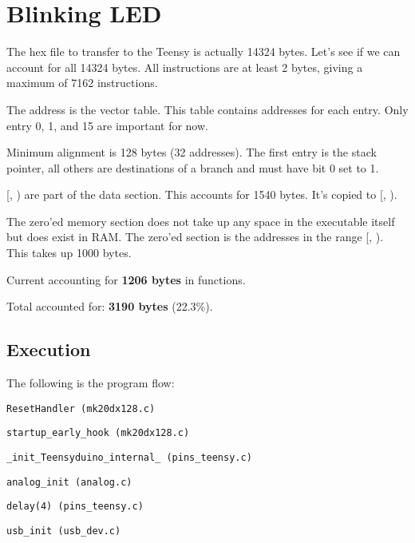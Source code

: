 \newpage
\section{Blinking LED}

The hex file to transfer to the Teensy is actually 14324 bytes.
Let's see if we can account for all 14324 bytes.
All instructions are at least 2 bytes, giving a maximum of 7162 instructions.

The address  is the vector table. This table contains
addresses for each entry. Only entry 0, 1, and 15 are important for now.

Minimum alignment is 128 bytes (32 addresses). The first entry is the stack
pointer, all others are destinations of a branch and must have bit 0 set to 1.

[, ) are part of the data
section. This accounts for 1540 bytes. It's copied to
[, ).

The zero'ed memory section does not take up any space in the executable itself
but does exist in RAM. The zero'ed section is the addresses in the range
[, ).
This takes up 1000 bytes.

Current accounting for \textbf{1206 bytes} in functions.

Total accounted for: \textbf{3190 bytes} (22.3\%).

\subsection{Execution}

The following is the program flow:

\indent \texttt{ResetHandler (mk20dx128.c)}

\hspace{2mm} \texttt{startup\_early\_hook (mk20dx128.c)}

\hspace{2mm} \texttt{\_init\_Teensyduino\_internal\_ (pins\_teensy.c)}

\hspace{4mm} \texttt{analog\_init (analog.c)}

\hspace{4mm} \texttt{delay(4) (pins\_teensy.c)}

\hspace{4mm} \texttt{usb\_init (usb\_dev.c)}

